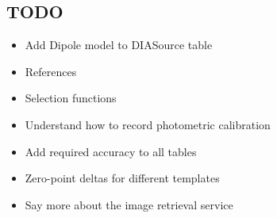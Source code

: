 \documentclass[12pt]{article}
\begin{document}
\begin{todo}

\clearpage

\section{TODO}

\begin{itemize}

    \item Add Dipole model to DIASource table
    \item References

    \item Selection functions
    \item Understand how to record photometric calibration
    \item Add required accuracy to all tables

    \item Zero-point deltas for different templates
    \item Say more about the image retrieval service


\end{itemize}

\end{todo}
\end{document}
